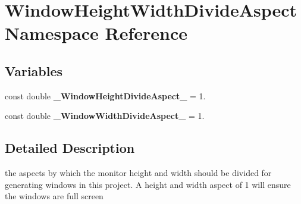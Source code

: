 \hypertarget{namespace_window_height_width_divide_aspect}{}\section{Window\+Height\+Width\+Divide\+Aspect Namespace Reference}
\label{namespace_window_height_width_divide_aspect}
\subsection*{Variables}
\begin{DoxyCompactItemize}
\item 
\hypertarget{namespace_window_height_width_divide_aspect_a69fb9ab234f9a5360344288f324acb87}{}\label{namespace_window_height_width_divide_aspect_a69fb9ab234f9a5360344288f324acb87} 
const double {\bfseries \+\_\+\+Window\+Height\+Divide\+Aspect\+\_\+} = 1.
\item 
\hypertarget{namespace_window_height_width_divide_aspect_aa05b8fbb0ce9351718c692bae2d19917}{}\label{namespace_window_height_width_divide_aspect_aa05b8fbb0ce9351718c692bae2d19917} 
const double {\bfseries \+\_\+\+Window\+Width\+Divide\+Aspect\+\_\+} = 1.
\end{DoxyCompactItemize}


\subsection{Detailed Description}
the aspects by which the monitor height and width should be divided for generating windows in this project. A height and width aspect of 1 will ensure the windows are full screen 